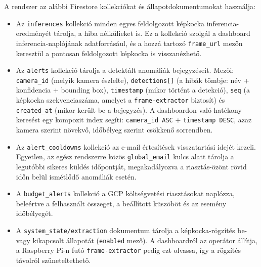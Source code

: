         A rendszer az alábbi Firestore kollekciókat és állapotdokumentumokat használja:

        \begin{itemize}
            \item Az \texttt{inferences} kollekció minden egyes feldolgozott képkocka inferencia-eredményét tárolja, a hiba nélkülieket is.
            Ez a kollekció szolgál a dashboard inferencia-naplójának adatforrásául, és a hozzá tartozó \texttt{frame\_url} mezőn keresztül
            a pontosan feldolgozott képkocka is visszanézhető.

            \item Az \texttt{alerts} kollekció tárolja a detektált anomáliák bejegyzéseit. Mezői: \texttt{camera\_id} (melyik kamera észlelte),
            \texttt{detections[]} (a hibák tömbje: név + konfidencia + bounding box), \texttt{timestamp} (mikor történt a detekció),
            \texttt{seq} (a képkocka szekvenciaszáma, amelyet a \texttt{frame-extractor} biztosít) és \texttt{created\_at} (mikor került be a bejegyzés).
            A dashboardon való hatékony keresést egy kompozit index segíti: \texttt{camera\_id ASC} + \texttt{timestamp DESC},
            azaz kamera szerint növekvő, időbélyeg szerint csökkenő sorrendben.

            \item Az \texttt{alert\_cooldowns} kollekció az e-mail értesítések visszatartási idejét kezeli. Egyetlen, az egész rendszerre közös
            \texttt{global\_email} kulcs alatt tárolja a legutóbbi sikeres küldés időpontját, megakadályozva a riasztás-özönt rövid időn belül ismétlődő anomáliák esetén.

            \item A \texttt{budget\_alerts} kollekció a GCP költségvetési riasztásokat naplózza, beleértve a felhasznált összeget,
            a beállított küszöböt és az esemény időbélyegét.

            \item A \texttt{system\_state/extraction} dokumentum tárolja a képkocka-rögzítés be- vagy kikapcsolt állapotát (\texttt{enabled} mező).
            A dashboardról az operátor állítja, a Raspberry Pi-n futó \texttt{frame-extractor} pedig ezt olvassa, így a rögzítés távolról szüneteltethető.
        \end{itemize}


